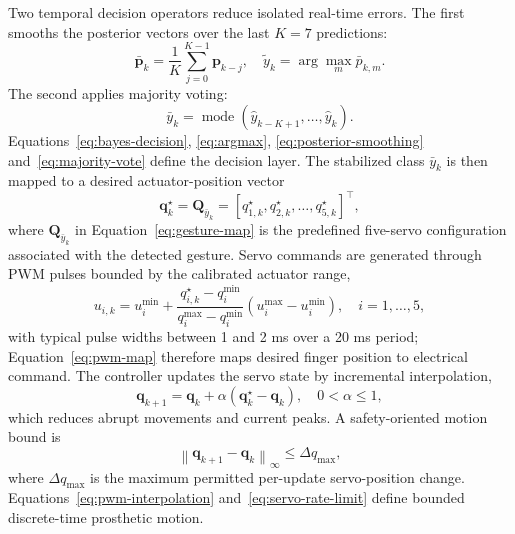 \documentclass[technologies,article,submit,pdftex,moreauthors]{Definitions/mdpi}
\begin{document}
Two temporal decision operators reduce isolated real-time errors. The first smooths the posterior vectors over the last $K=7$ predictions:
\begin{equation}
    \label{eq:posterior-smoothing}
    \bar{\mathbf{p}}_k
    =
    \frac{1}{K}
    \sum_{j=0}^{K-1}
    \mathbf{p}_{k-j},
    \quad
    \tilde{y}_k = \arg\max_m \bar{p}_{k,m}.
\end{equation}
The second applies majority voting:
\begin{equation}
    \label{eq:majority-vote}
    \bar{y}_k =
    \operatorname{mode}\left(
    \hat{y}_{k-K+1},\ldots,\hat{y}_{k}
    \right).
\end{equation}
Equations~\eqref{eq:bayes-decision}, \eqref{eq:argmax}, \eqref{eq:posterior-smoothing} and~\eqref{eq:majority-vote} define the decision layer.
The stabilized class $\bar{y}_k$ is then mapped to a desired actuator-position vector
\begin{equation}
    \label{eq:gesture-map}
    \mathbf{q}^{\star}_k = \mathbf{Q}_{\bar{y}_k}
    =
    \left[q^{\star}_{1,k},q^{\star}_{2,k},\ldots,q^{\star}_{5,k}\right]^{\top},
\end{equation}
where $\mathbf{Q}_{\bar{y}_k}$ in Equation~\eqref{eq:gesture-map} is the predefined five-servo configuration associated with the detected gesture. Servo commands are generated through PWM pulses bounded by the calibrated actuator range,
\begin{equation}
    \label{eq:pwm-map}
    u_{i,k}=
    u^{\min}_{i}
    +
    \frac{q^{\star}_{i,k}-q^{\min}_{i}}{q^{\max}_{i}-q^{\min}_{i}}
    \left(u^{\max}_{i}-u^{\min}_{i}\right),
    \quad i=1,\ldots,5,
\end{equation}
with typical pulse widths between 1 and 2 ms over a 20 ms period; Equation~\eqref{eq:pwm-map} therefore maps desired finger position to electrical command. The controller updates the servo state by incremental interpolation,
\begin{equation}
    \label{eq:pwm-interpolation}
    \mathbf{q}_{k+1}=\mathbf{q}_{k}+\alpha\left(\mathbf{q}^{\star}_{k}-\mathbf{q}_{k}\right),
    \quad 0<\alpha\leq1,
\end{equation}
which reduces abrupt movements and current peaks. A safety-oriented motion bound is
\begin{equation}
    \label{eq:servo-rate-limit}
    \left\|\mathbf{q}_{k+1}-\mathbf{q}_{k}\right\|_{\infty}
    \leq
    \Delta q_{\max},
\end{equation}
where $\Delta q_{\max}$ is the maximum permitted per-update servo-position change. Equations~\eqref{eq:pwm-interpolation} and~\eqref{eq:servo-rate-limit} define bounded discrete-time prosthetic motion.
\end{document}
